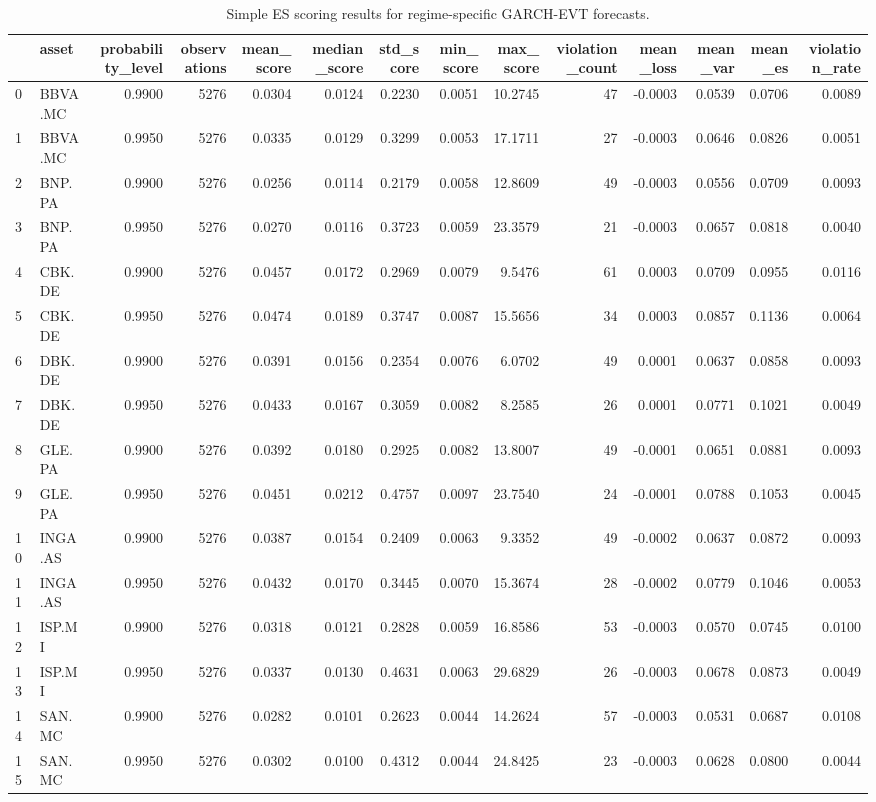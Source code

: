 \begin{table}
\caption{Simple ES scoring results for regime-specific GARCH-EVT forecasts.}
\label{tab:es_scoring_regime}
\begin{tabular}{llrrrrrrrrrrrr}
\toprule
 & asset & probability_level & observations & mean_score & median_score & std_score & min_score & max_score & violation_count & mean_loss & mean_var & mean_es & violation_rate \\
\midrule
0 & BBVA.MC & 0.9900 & 5276 & 0.0304 & 0.0124 & 0.2230 & 0.0051 & 10.2745 & 47 & -0.0003 & 0.0539 & 0.0706 & 0.0089 \\
1 & BBVA.MC & 0.9950 & 5276 & 0.0335 & 0.0129 & 0.3299 & 0.0053 & 17.1711 & 27 & -0.0003 & 0.0646 & 0.0826 & 0.0051 \\
2 & BNP.PA & 0.9900 & 5276 & 0.0256 & 0.0114 & 0.2179 & 0.0058 & 12.8609 & 49 & -0.0003 & 0.0556 & 0.0709 & 0.0093 \\
3 & BNP.PA & 0.9950 & 5276 & 0.0270 & 0.0116 & 0.3723 & 0.0059 & 23.3579 & 21 & -0.0003 & 0.0657 & 0.0818 & 0.0040 \\
4 & CBK.DE & 0.9900 & 5276 & 0.0457 & 0.0172 & 0.2969 & 0.0079 & 9.5476 & 61 & 0.0003 & 0.0709 & 0.0955 & 0.0116 \\
5 & CBK.DE & 0.9950 & 5276 & 0.0474 & 0.0189 & 0.3747 & 0.0087 & 15.5656 & 34 & 0.0003 & 0.0857 & 0.1136 & 0.0064 \\
6 & DBK.DE & 0.9900 & 5276 & 0.0391 & 0.0156 & 0.2354 & 0.0076 & 6.0702 & 49 & 0.0001 & 0.0637 & 0.0858 & 0.0093 \\
7 & DBK.DE & 0.9950 & 5276 & 0.0433 & 0.0167 & 0.3059 & 0.0082 & 8.2585 & 26 & 0.0001 & 0.0771 & 0.1021 & 0.0049 \\
8 & GLE.PA & 0.9900 & 5276 & 0.0392 & 0.0180 & 0.2925 & 0.0082 & 13.8007 & 49 & -0.0001 & 0.0651 & 0.0881 & 0.0093 \\
9 & GLE.PA & 0.9950 & 5276 & 0.0451 & 0.0212 & 0.4757 & 0.0097 & 23.7540 & 24 & -0.0001 & 0.0788 & 0.1053 & 0.0045 \\
10 & INGA.AS & 0.9900 & 5276 & 0.0387 & 0.0154 & 0.2409 & 0.0063 & 9.3352 & 49 & -0.0002 & 0.0637 & 0.0872 & 0.0093 \\
11 & INGA.AS & 0.9950 & 5276 & 0.0432 & 0.0170 & 0.3445 & 0.0070 & 15.3674 & 28 & -0.0002 & 0.0779 & 0.1046 & 0.0053 \\
12 & ISP.MI & 0.9900 & 5276 & 0.0318 & 0.0121 & 0.2828 & 0.0059 & 16.8586 & 53 & -0.0003 & 0.0570 & 0.0745 & 0.0100 \\
13 & ISP.MI & 0.9950 & 5276 & 0.0337 & 0.0130 & 0.4631 & 0.0063 & 29.6829 & 26 & -0.0003 & 0.0678 & 0.0873 & 0.0049 \\
14 & SAN.MC & 0.9900 & 5276 & 0.0282 & 0.0101 & 0.2623 & 0.0044 & 14.2624 & 57 & -0.0003 & 0.0531 & 0.0687 & 0.0108 \\
15 & SAN.MC & 0.9950 & 5276 & 0.0302 & 0.0100 & 0.4312 & 0.0044 & 24.8425 & 23 & -0.0003 & 0.0628 & 0.0800 & 0.0044 \\
\bottomrule
\end{tabular}
\end{table}
